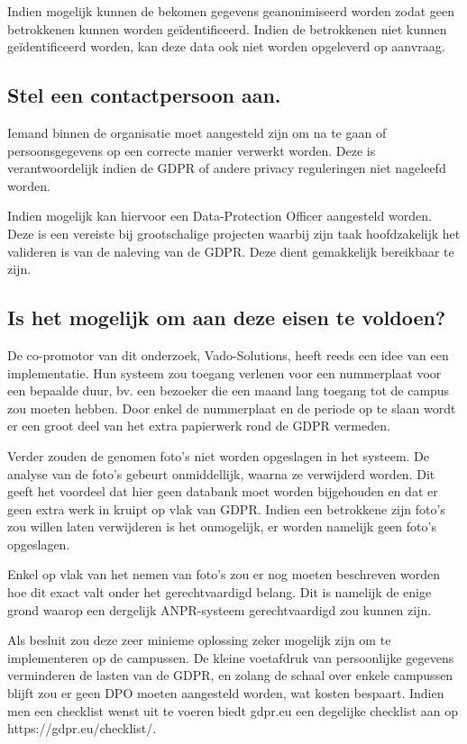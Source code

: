 Indien mogelijk kunnen de bekomen gegevens geanonimiseerd worden zodat geen betrokkenen kunnen worden geïdentificeerd. Indien de betrokkenen niet kunnen geïdentificeerd worden, kan deze data ook niet worden opgeleverd op aanvraag.

\subsection{Stel een contactpersoon aan.}
Iemand binnen de organisatie moet aangesteld zijn om na te gaan of persoonsgegevens op een correcte manier verwerkt worden. Deze is verantwoordelijk indien de GDPR of andere privacy reguleringen niet nageleefd worden.

Indien mogelijk kan hiervoor een Data-Protection Officer aangesteld worden. Deze is een vereiste bij grootschalige projecten waarbij zijn taak hoofdzakelijk het valideren is van de naleving van de GDPR. Deze dient gemakkelijk bereikbaar te zijn.

\subsection{Is het mogelijk om aan deze eisen te voldoen?}
De co-promotor van dit onderzoek, Vado-Solutions, heeft reeds een idee van een implementatie. Hun systeem zou toegang verlenen voor een nummerplaat voor een bepaalde duur, bv. een bezoeker die een maand lang toegang tot de campus zou moeten hebben. Door enkel de nummerplaat en de periode op te slaan wordt er een groot deel van het extra papierwerk rond de GDPR vermeden.

Verder zouden de genomen foto's niet worden opgeslagen in het systeem. De analyse van de foto's gebeurt onmiddellijk, waarna ze verwijderd worden. Dit geeft het voordeel dat hier geen databank moet worden bijgehouden en dat er geen extra werk in kruipt op vlak van GDPR. Indien een betrokkene zijn foto's zou willen laten verwijderen is het onmogelijk, er worden namelijk geen foto's opgeslagen.

Enkel op vlak van het nemen van foto's zou er nog moeten beschreven worden hoe dit exact valt onder het gerechtvaardigd belang. Dit is namelijk de enige grond waarop een dergelijk ANPR-systeem gerechtvaardigd zou kunnen zijn.

Als besluit zou deze zeer minieme oplossing zeker mogelijk zijn om te implementeren op de campussen. De kleine voetafdruk van persoonlijke gegevens verminderen de lasten van de GDPR, en zolang de schaal over enkele campussen blijft zou er geen DPO moeten aangesteld worden, wat kosten bespaart. Indien men een checklist wenst uit te voeren biedt gdpr.eu een degelijke checklist aan op https://gdpr.eu/checklist/.


